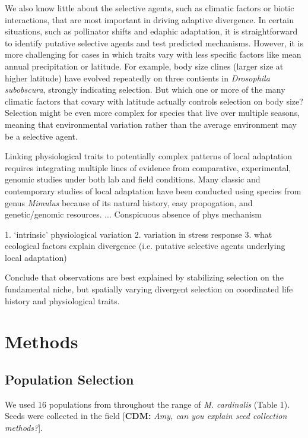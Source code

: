 \documentclass[11pt, oneside]{article}\usepackage[]{graphicx}\usepackage[]{color}
\newcommand{\cdm}[1]{{ \color{magenta} [{\bf{CDM:}} {\em#1}]}} %
\begin{document}
We also know little about the selective agents, such as climatic factors or biotic interactions, that are most important in driving adaptive divergence. In certain situations, such as pollinator shifts and edaphic adaptation, it is straightforward to identify putative selective agents and test predicted mechanisms. However, it is more challenging for cases in which traits vary with less specific factors like mean annual precipitation or latitude. For example, body size clines (larger size at higher latitude) have evolved repeatedly on three contients in \textit{Drosophila subobscura}, strongly indicating selection. But which one or more of the many climatic factors that covary with latitude actually controls selection on body size? Selection might be even more complex for species that live over multiple seasons, meaning that environmental variation rather than the average environment may be a selective agent.

Linking physiological traits to potentially complex patterns of local adaptation requires integrating multiple lines of evidence from comparative, experimental, genomic studies under both lab and field conditions. Many classic and contemporary studies of local adaptation have been conducted using species from genus \textit{Mimulus} because of its natural history, easy propogation, and genetic/genomic resources. ... Conspicuous absence of phys mechanism

1. `intrinsic' physiological variation
2. variation in stress response
3. what ecological factors explain divergence (i.e. putative selective agents underlying local adaptation)

Conclude that observations are best explained by stabilizing selection on the fundamental niche, but spatially varying divergent selection on coordinated life history and physiological traits.

\section*{Methods}

\subsection*{Population Selection}

We used 16 populations from throughout the range of \textit{M. cardinalis} (Table 1). Seeds were collected in the field \cdm{Amy, can you explain seed collection methods?}.
\end{document}

